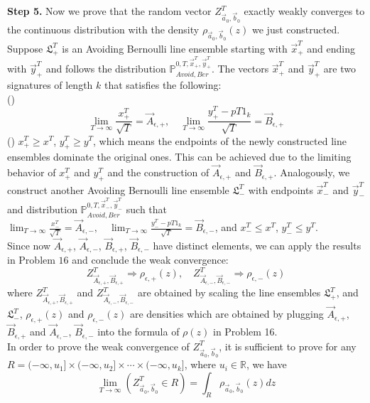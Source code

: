 \documentclass[12pt]{article}
\begin{document}
\textbf{Step 5. }Now we prove that the random vector $Z^{T}_{\vec{a}_{0},\vec{b}_{0}}$ exactly weakly converges to the continuous distribution with the density $\rho_{\vec{a}_{0},\vec{b}_{0}}(z)$ we just constructed. Suppose $\mathfrak{L}_{+}^{T}$ is an Avoiding Bernoulli line ensemble starting with $\vec{x}^{T}_{+}$ and ending with $\vec{y}^{T}_{+}$ and follows the distribution $\mathbb{P}_{Avoid,Ber}^{0,T,\vec{x}^{T}_{+},\vec{y}^{T}_{+}}$. The vectors $\vec{x}^{T}_{+}$ and $\vec{y}^{T}_{+}$ are two signatures of length $k$ that satisfies the following:\\
()$$\lim_{T\rightarrow\infty}\frac{x^{T}_{+}}{\sqrt{T}}=\vec{A}_{\epsilon,+},\quad \lim_{T\rightarrow\infty}\frac{y^{T}_{+}-pT1_{k}}{\sqrt{T}}=\vec{B}_{\epsilon,+}$$
() $x^{T}_{+}\geqslant x^{T}$, $y^{T}_{+}\geqslant y^{T}$, which means the endpoints of the newly constructed line ensembles dominate the original ones. This can be achieved due to the limiting behavior of $x^{T}_{+}$ and $y^{T}_{+}$ and the construction of $\vec{A}_{\epsilon,+}$ and $\vec{B}_{\epsilon,+}$.
Analogously, we construct another Avoiding Bernoulli line ensemble $\mathfrak{L}_{-}^{T}$ with endpoints $\vec{x}^{T}_{-}$ and $\vec{y}^{T}_{-}$ and distribution $\mathbb{P}_{Avoid,Ber}^{0,T,\vec{x}^{T}_{-},\vec{y}^{T}_{-}}$ such that $\lim_{T\rightarrow\infty}\frac{x^{T}_{-}}{\sqrt{T}}=\vec{A}_{\epsilon,-},\quad \lim_{T\rightarrow\infty}\frac{y^{T}_{-}-pT1_{k}}{\sqrt{T}}=\vec{B}_{\epsilon,-}$, and $x^{T}_{-}\leqslant x^{T}$, $y^{T}_{-}\leqslant y^{T}$.\\
Since now $\vec{A}_{\epsilon,+}$, $\vec{A}_{\epsilon,-}$, $\vec{B}_{\epsilon, +}$, $\vec{B}_{\epsilon,-}$ have distinct elements, we can apply the results in Problem $16$ and conclude the weak convergence:
$$Z^{T}_{\vec{A}_{\epsilon,+}, \vec{B}_{\epsilon, +}}\Rightarrow \rho_{\epsilon,+}(z),\quad Z^{T}_{\vec{A}_{\epsilon,-}, \vec{B}_{\epsilon, -}}\Rightarrow \rho_{\epsilon,-}(z)$$
where $Z^{T}_{\vec{A}_{\epsilon,+},\vec{B}_{\epsilon,+}}$ and $Z^{T}_{\vec{A}_{\epsilon,-},\vec{B}_{\epsilon,-}}$ are obtained by scaling the line ensembles $\mathfrak{L}_{+}^{T}$, and $\mathfrak{L}_{-}^{T}$, $\rho_{\epsilon,+}(z)$ and $\rho_{\epsilon,-}(z)$ are densities which are obtained by plugging $\vec{A}_{\epsilon,+}$, $\vec{B}_{\epsilon,+}$ and $\vec{A}_{\epsilon,-}$, $\vec{B}_{\epsilon,-}$ into the formula of $\rho(z)$ in Problem 16. \\
In order to prove the weak convergence of $Z^{T}_{\vec{a}_{0},\vec{b}_{0}}$, it is sufficient to prove for any $R=(-\infty,u_{1}]\times(-\infty,u_{2}]\times\cdots\times(-\infty,u_{k}]$, where $u_{i}\in\mathbb{R}$, we have $$\lim_{T\rightarrow\infty}(Z^{T}_{\vec{a}_{0},\vec{b}_{0}}\in R)=\int_{R}\rho_{\vec{a}_{0},\vec{b}_{0}}(z)dz$$
\end{document}
